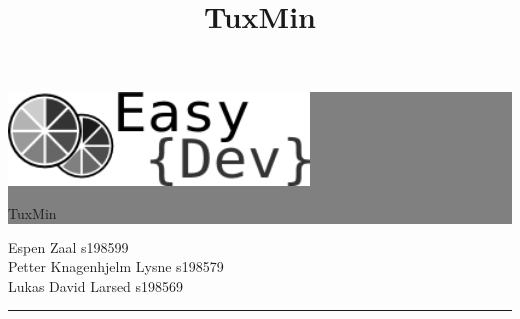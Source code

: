 \setlength{\oddsidemargin}{0mm} %
\setlength{\evensidemargin}{0mm} %

\newcommand{\HRule}[1]{\hfill \rule{0.2\linewidth}{#1}} %



\thispagestyle{empty} %


\colorbox{grey}{
	\parbox[t]{1.0\linewidth}{
		\centering \fontsize{50pt}{80pt}\selectfont %
		\vspace*{0.7cm} %
		
		\hfill 
		\includegraphics[width=80mm]{./img/fremside/logo.png} \\
		\hfill 
		\fontsize{30pt}{50pt}\selectfont 
		{\selectfont 
		TuxMin
		\title{TuxMin}
		}
		\par
		
		\vspace*{0.5cm} %
	}
}


\vfill %


{\centering \large 
\hfill Espen Zaal s198599 \\
\hfill Petter Knagenhjelm Lysne s198579 \\
\hfill Lukas David Larsed s198569 \\


\HRule{1pt}} %


\clearpage %